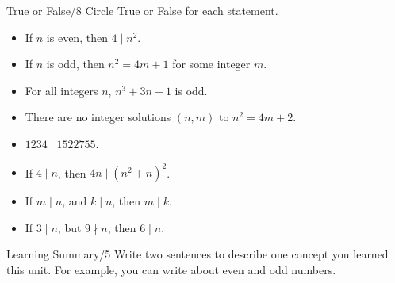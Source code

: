 \documentclass[12pt,letterpaper]{article}
\begin{document}
\begin{problem}{True or False\hfill/8}
  Circle True or False for each statement.

  \begin{itemize}
    \item If \(n\) is even, then \(4 \mid n^2\). \hfill \TFTrue
    \item If \(n\) is odd, then \(n^2 = 4m + 1\) for some integer \(m\).
    \hfill \TFTrue
    \item For all integers \(n\), \(n^3 + 3n - 1\) is odd. \hfill \TFTrue
    \item There are no integer solutions \((n, m)\) to \(n^2 = 4m + 2\).
    \hfill \TFTrue
    \item \(1234 \mid 1522755\). \hfill \TFFalse
    \item If \(4 \mid n\), then \(4n \mid (n^2+n)^2\). \hfill \TFTrue
    \item If \(m \mid n\), and \(k \mid n\), then \(m \mid k\). \hfill \TFFalse
    \item If \(3 \mid n\), but \(9 \nmid n\), then \(6 \mid n\). \hfill
    \TFFalse
  \end{itemize}
\end{problem}

\begin{problem}{Learning Summary\hfill/5}
  Write two sentences to describe one concept you learned this unit. For example, you can
  write about even and odd numbers.
\end{problem}
\end{document}
